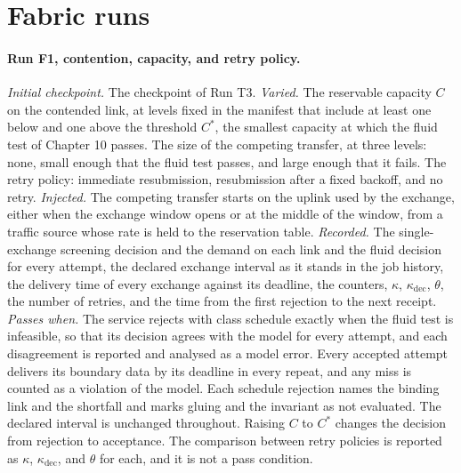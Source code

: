 \documentclass[11pt,openany]{book}
\theoremstyle{remark}
\begin{document}
\section{Fabric runs}

\paragraph{Run F1, contention, capacity, and retry policy.} \emph{Initial checkpoint.} The checkpoint of Run T3. \emph{Varied.} The reservable capacity $C$ on the contended link, at levels fixed in the manifest that include at least one below and one above the threshold $C^{*}$, the smallest capacity at which the fluid test of Chapter 10 passes. The size of the competing transfer, at three levels: none, small enough that the fluid test passes, and large enough that it fails. The retry policy: immediate resubmission, resubmission after a fixed backoff, and no retry. \emph{Injected.} The competing transfer starts on the uplink used by the exchange, either when the exchange window opens or at the middle of the window, from a traffic source whose rate is held to the reservation table. \emph{Recorded.} The single-exchange screening decision and the demand on each link and the fluid decision for every attempt, the declared exchange interval as it stands in the job history, the delivery time of every exchange against its deadline, the counters, $\kappa$, $\kappa_{\mathrm{dec}}$, $\theta$, the number of retries, and the time from the first rejection to the next receipt. \emph{Passes when.} The service rejects with class schedule exactly when the fluid test is infeasible, so that its decision agrees with the model for every attempt, and each disagreement is reported and analysed as a model error. Every accepted attempt delivers its boundary data by its deadline in every repeat, and any miss is counted as a violation of the model. Each schedule rejection names the binding link and the shortfall and marks gluing and the invariant as not evaluated. The declared interval is unchanged throughout. Raising $C$ to $C^{*}$ changes the decision from rejection to acceptance. The comparison between retry policies is reported as $\kappa$, $\kappa_{\mathrm{dec}}$, and $\theta$ for each, and it is not a pass condition.
\end{document}
